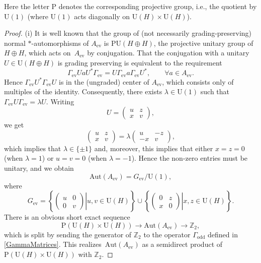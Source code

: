 \documentclass[pdftex]{sigma}
\numberwithin{equation}{section}
\newcommand{\Z}{\mathbb{Z}}
\newcommand{\Aut}{\mathrm{Aut}}
\newcommand{\U}{\mathrm{U}}
\begin{document}
Here the letter $\mathrm{P}$ denotes the corresponding projective group, i.e., the quotient by $\U(1)$ (where $\U(1)$ acts diagonally on $\U(H) \times \U(H)$).

\begin{proof}
(i) It is well known that the group of (not necessarily grading-preserving) normal $*$-automorphisms of $A_{\mathrm{ev}}$ is $\mathrm{PU}(H \oplus H)$, the projective unitary group of $H \oplus H$, which acts on~$A_{\mathrm{ev}}$ by conjugation.
That the conjugation with a unitary $U \in \U(H\oplus H)$ is grading preserving is equivalent to the requirement
\begin{equation*}
 \Gamma_{\mathrm{ev}} U a U^* \Gamma_{\mathrm{ev}} = U \Gamma_{\mathrm{ev}} a \Gamma_{\mathrm{ev}} U^*, \qquad \forall a \in A_{\mathrm{ev}}.
\end{equation*}
Hence $\Gamma_{\mathrm{ev}}U^*\Gamma_{\mathrm{ev}} U$ is in the (ungraded) center of $A_{\mathrm{ev}}$, which consists only of multiples of the identity.
Consequently, there exists $\lambda \in \U(1)$ such that $\Gamma_{\mathrm{ev}} U\Gamma_{\mathrm{ev}} = \lambda U$.
Writing
\begin{equation*}
 U = \begin{pmatrix} u & z \\ x & v \end{pmatrix},
 \end{equation*}
 we get
 \begin{equation*}
 \begin{pmatrix} u & z \\ x & v \end{pmatrix} = \lambda\begin{pmatrix} u & -z \\ -x & v \end{pmatrix},
\end{equation*}
which implies that $\lambda \in \{\pm 1\}$ and, moreover, this implies that either $x = z = 0$ (when $\lambda = 1$) or $u = v = 0$ (when $\lambda = -1$).
Hence the non-zero entries must be unitary, and we obtain
\begin{equation*}	%
\Aut(A_{\mathrm{ev}}) = G_{\mathrm{ev}}/\U(1),
\end{equation*}
where
\begin{equation} \label{DefGev}
 G_{\mathrm{ev}} = \left\{ \left.\begin{pmatrix} u & 0 \\ 0 & v \end{pmatrix} \right| u, v \in \U(H)\right\} \cup \left\{ \left.\begin{pmatrix} 0 & z \\ x & 0 \end{pmatrix} \right| x, z \in \U(H)\right\}.
\end{equation}
There is an obvious short exact sequence
\begin{equation*}
\mathrm{P}(\U(H) \times \U(H)) \to \Aut(A_{\mathrm{ev}}) \to \Z_2,
\end{equation*}
which is split by sending the generator of $\Z_2$ to the operator $\Gamma_{\mathrm{odd}}$ defined in \eqref{GammaMatrices}.
This realizes~$\Aut(A_{\mathrm{ev}})$ as a semidirect product of $\mathrm{P}(\U(H) \times \U(H))$ with $\Z_2$.


\end{proof}
\end{document}
